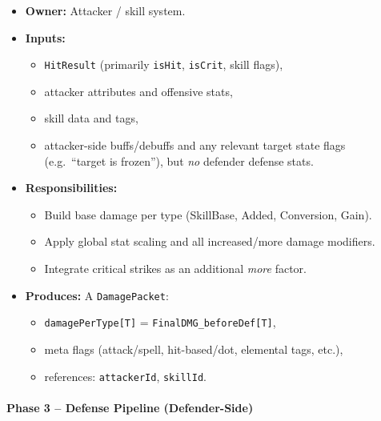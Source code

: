 \begin{itemize}
	\item \textbf{Owner:} Attacker / skill system.
	\item \textbf{Inputs:}
	\begin{itemize}
		\item \texttt{HitResult} (primarily \texttt{isHit}, \texttt{isCrit}, skill flags),
		\item attacker attributes and offensive stats,
		\item skill data and tags,
		\item attacker-side buffs/debuffs and any relevant target state flags
		(e.g.\ ``target is frozen''), but \emph{no} defender defense stats.
	\end{itemize}
	\item \textbf{Responsibilities:}
	\begin{itemize}
		\item Build base damage per type (SkillBase, Added, Conversion, Gain).
		\item Apply global stat scaling and all increased/more damage modifiers.
		\item Integrate critical strikes as an additional \emph{more} factor.
	\end{itemize}
	\item \textbf{Produces:} A \texttt{DamagePacket}:
	\begin{itemize}
		\item \texttt{damagePerType[T]} = \texttt{FinalDMG\_beforeDef[T]},
		\item meta flags (attack/spell, hit-based/dot, elemental tags, etc.),
		\item references: \texttt{attackerId}, \texttt{skillId}.
	\end{itemize}
\end{itemize}

\paragraph{Phase 3 -- Defense Pipeline (Defender-Side)}

